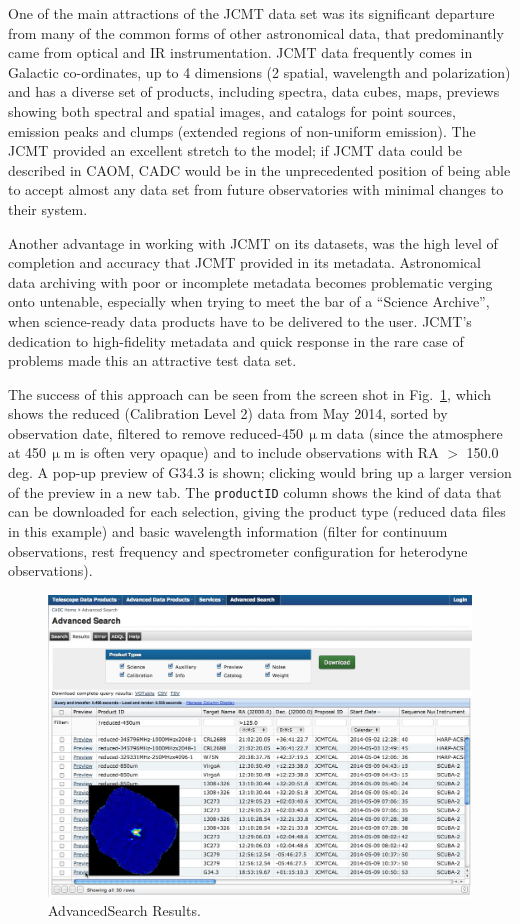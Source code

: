 \documentclass[final,authoryear,5p,times,twocolumn]{elsarticle}
\begin{document}
One of the main attractions of the JCMT data set was its significant
departure from many of the common forms of other astronomical data,
that predominantly came from optical and IR instrumentation. JCMT data
frequently comes in Galactic co-ordinates, up to 4 dimensions (2
spatial, wavelength and polarization) and has a diverse set of
products, including spectra, data cubes, maps, previews showing both spectral
and spatial images,  and catalogs for point sources, emission peaks and
clumps (extended regions of non-uniform emission).  The JCMT
provided an excellent stretch to the model; if JCMT data could be
described in CAOM, CADC would be in the unprecedented position of
being able to accept almost any data set from future observatories
with minimal changes to their system.

Another advantage in working with JCMT on its datasets, was the high
level of completion and accuracy that JCMT provided in its
metadata. Astronomical data archiving with poor or incomplete metadata
becomes problematic verging onto untenable, especially when trying to
meet the bar of a ``Science Archive'', when science-ready data products
have to be delivered to the user. JCMT's dedication to high-fidelity
metadata and quick response in the rare case of problems made this an
attractive test data set.

The success of
this approach can be seen from the screen shot in Fig.~\ref{fig:asresults},
which shows the reduced (Calibration Level 2) data from May 2014, sorted by
observation date, filtered to remove reduced-450\,$\upmu$m data (since the atmosphere
at 450\,$\upmu$m is often very opaque) and to include observations with RA $>$ 150.0 deg.
A pop-up preview of G34.3 is shown; clicking would bring up a larger version
of the preview in a new tab.  The \texttt{productID} column shows the kind of data that
can be downloaded for each selection, giving the product type (reduced data files in
this example) and basic wavelength information (filter for continuum observations,
rest frequency and spectrometer configuration for heterodyne observations).

\begin{figure}[t]
\includegraphics[width=\columnwidth]{acjsa_fig3}
\caption{AdvancedSearch Results.}
\label{fig:asresults}
\end{figure}
\end{document}
